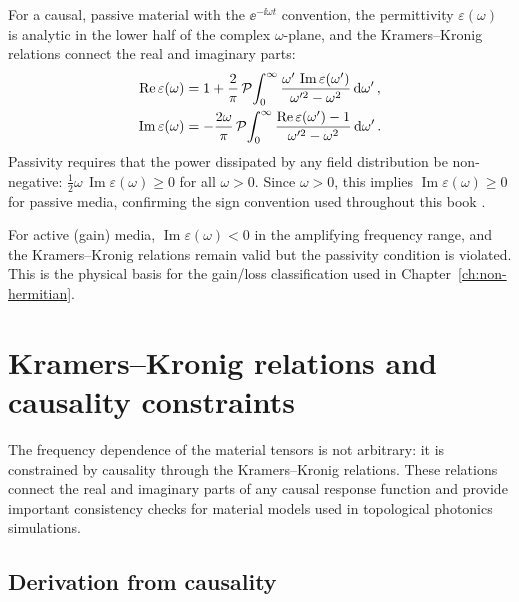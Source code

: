 For a causal, passive material with the $\ee^{-\ii\omega t}$ convention,
the permittivity $\varepsilon(\omega)$ is analytic in the lower half
of the complex $\omega$-plane, and the Kramers--Kronig relations
connect the real and imaginary parts:
\begin{align}\label{eq:appD-kk-causal}
  \operatorname{Re}\varepsilon(\omega)
  &= 1+\frac{2}{\pi}\,\mathcal{P}\!\int_0^\infty
  \frac{\omega'\,\operatorname{Im}\varepsilon(\omega')}
  {\omega'^2-\omega^2}\,\mathrm{d}\omega'\,,\notag\\
  \operatorname{Im}\varepsilon(\omega)
  &= -\frac{2\omega}{\pi}\,\mathcal{P}\!\int_0^\infty
  \frac{\operatorname{Re}\varepsilon(\omega')-1}
  {\omega'^2-\omega^2}\,\mathrm{d}\omega'\,.
\end{align}
Passivity requires that the power dissipated by any field distribution
be non-negative:
$\frac{1}{2}\omega\,\operatorname{Im}\varepsilon(\omega)\geq 0$
for all $\omega>0$.  Since $\omega>0$, this implies
$\operatorname{Im}\varepsilon(\omega)\geq 0$ for passive media,
confirming the sign convention used throughout this book
\cite{silveirinha2016bulk,ozawa2018topological}.

For active (gain) media, $\operatorname{Im}\varepsilon(\omega)<0$
in the amplifying frequency range, and the Kramers--Kronig relations
remain valid but the passivity condition is violated.  This is the
physical basis for the gain/loss classification used in
Chapter~\ref{ch:non-hermitian}.


\section{Kramers--Kronig relations and causality constraints}
\label{sec:appD-kramers-kronig-detail}

The frequency dependence of the material tensors is not arbitrary: it
is constrained by causality through the Kramers--Kronig relations.
These relations connect the real and imaginary parts of any causal
response function and provide important consistency checks for
material models used in topological photonics simulations.

\subsection{Derivation from causality}
\label{sec:appD-kk-causality-derivation}

